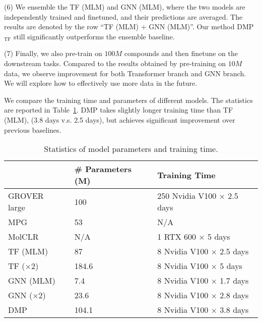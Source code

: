 \documentclass{article}
\newcommand{\ourMTF}{DMP$_\textrm{TF}$}
\begin{document}
\noindent(6) We ensemble the TF (MLM) and GNN (MLM), where the two models are independently trained and finetuned, and their predictions are averaged. The results are denoted by the row ``TF (MLM) + GNN (MLM)''. Our method \ourMTF{} still significantly outperforms the ensemble baseline.
 
\noindent(7) Finally, we also pre-train on $100M$ compounds and then finetune on the downstream tasks. Compared to the results obtained by pre-training on $10M$ data, we observe improvement for both Transformer branch and GNN branch. We will explore how to effectively use more data in the future. 


We compare the training time and parameters of different models. The statistics are reported in Table~\ref{tab:summary_modelpram_time}. DMP takes slightly longer training time than TF (MLM), (3.8 days v.s. 2.5 days), but achieves significant improvement over previous baselines.

\begin{table}[!htbp]
\centering
\small
\begin{tabular}{lll}
\toprule
& \# Parameters (M) & Training Time \\
\midrule
GROVER large~\cite{rong2020self} & 100  & 250 Nvidia V100 $\times$ 2.5 days \\
MPG & 53 & N/A \\
MolCLR~\cite{wang2021molclr} & N/A & 1 RTX 600 $\times$ 5 days \\
TF (MLM) & 87 & 8 Nvidia V100 $\times$ 2.5 days \\
TF ($\times 2$) & 184.6 & 8 Nvidia V100 $\times$ 5 days \\
GNN (MLM) & 7.4 & 8 Nvidia V100 $\times$ 1.7 days \\
GNN ($\times 2$) & 23.6 & 8 Nvidia V100 $\times$ 2.8 days \\
DMP & 104.1 & 8 Nvidia V100 $\times$ 3.8 days\\
\bottomrule
\end{tabular}
\caption{Statistics of model parameters and training time.}
\label{tab:summary_modelpram_time}
\end{table}
\end{document}
